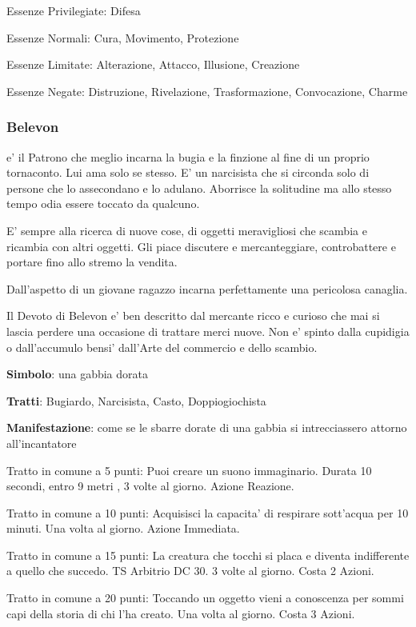 \documentclass[a4paper,11pt,twoside,openany]{book}
\begin{document}
{Essenze Privilegiate: Difesa

Essenze Normali: Cura, Movimento, Protezione

Essenze Limitate: Alterazione, Attacco, Illusione, Creazione

Essenze Negate: Distruzione, Rivelazione, Trasformazione, Convocazione, Charme

\subsubsection{Belevon}

\label{belevon}

e' il Patrono che meglio incarna la bugia e la finzione al fine di un proprio tornaconto. Lui ama solo se stesso. E' un narcisista che si circonda solo di persone che lo assecondano e lo adulano. Aborrisce la solitudine ma allo stesso tempo odia essere toccato da qualcuno.

E' sempre alla ricerca di nuove cose, di oggetti meravigliosi che scambia e ricambia con altri oggetti. Gli piace discutere e mercanteggiare, controbattere e portare fino allo stremo la vendita.

Dall'aspetto di un giovane ragazzo incarna perfettamente una pericolosa canaglia.

Il Devoto di Belevon e' ben descritto dal mercante ricco e curioso che mai si lascia perdere una occasione di trattare merci nuove. Non e' spinto dalla cupidigia o dall'accumulo bensi' dall'Arte del commercio e dello scambio.

\textbf{Simbolo}: una gabbia dorata

\textbf{Tratti}: Bugiardo, Narcisista, Casto, Doppiogiochista

\textbf{Manifestazione}: come se le sbarre dorate di una gabbia si intrecciassero attorno all'incantatore

\bigskip

Tratto in comune a 5 punti: Puoi creare un suono immaginario. Durata 10 secondi, entro 9 metri , 3 volte al giorno. Azione Reazione.

Tratto in comune a 10 punti: Acquisisci la capacita' di respirare sott'acqua per 10 minuti. Una volta al giorno. Azione Immediata.

Tratto in comune a 15 punti: La creatura che tocchi si placa e diventa indifferente a quello che succedo. TS Arbitrio DC 30. 3 volte al giorno. Costa 2 Azioni.

Tratto in comune a 20 punti: Toccando un oggetto vieni a conoscenza per sommi capi della storia di chi l'ha creato. Una volta al giorno. Costa 3 Azioni.

}
\end{document}
